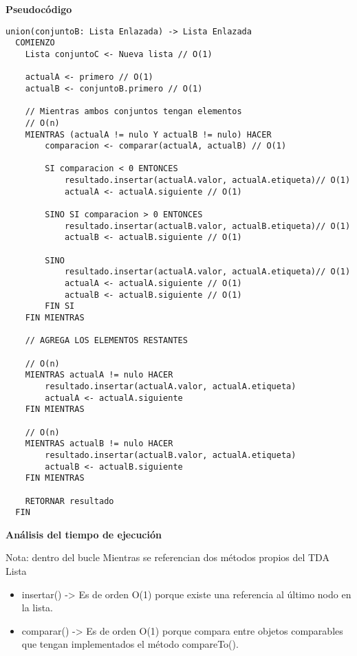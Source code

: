 \documentclass[12pt,letterpaper, onecolumn]{exam}
\begin{document}
\begin{questions}
\begin{solution}
    \end{solution}

    \begin{solution}
  \textbf{Pseudocódigo} 


\begin{verbatim}
union(conjuntoB: Lista Enlazada) -> Lista Enlazada
  COMIENZO
    Lista conjuntoC <- Nueva lista // O(1)
    
    actualA <- primero // O(1)
    actualB <- conjuntoB.primero // O(1)
    
    // Mientras ambos conjuntos tengan elementos
    // O(n)
    MIENTRAS (actualA != nulo Y actualB != nulo) HACER
        comparacion <- comparar(actualA, actualB) // O(1)
        
        SI comparacion < 0 ENTONCES
            resultado.insertar(actualA.valor, actualA.etiqueta)// O(1)
            actualA <- actualA.siguiente // O(1)
            
        SINO SI comparacion > 0 ENTONCES
            resultado.insertar(actualB.valor, actualB.etiqueta)// O(1)
            actualB <- actualB.siguiente // O(1)
            
        SINO
            resultado.insertar(actualA.valor, actualA.etiqueta)// O(1)
            actualA <- actualA.siguiente // O(1)
            actualB <- actualB.siguiente // O(1)
        FIN SI
    FIN MIENTRAS
    
    // AGREGA LOS ELEMENTOS RESTANTES

    // O(n)
    MIENTRAS actualA != nulo HACER
        resultado.insertar(actualA.valor, actualA.etiqueta)
        actualA <- actualA.siguiente
    FIN MIENTRAS
    
    // O(n)
    MIENTRAS actualB != nulo HACER
        resultado.insertar(actualB.valor, actualA.etiqueta)
        actualB <- actualB.siguiente
    FIN MIENTRAS
    
    RETORNAR resultado
  FIN 
  \end{verbatim}
    \textbf{Análisis del tiempo de ejecución} 

    Nota: dentro del bucle Mientras se referencian dos métodos propios del TDA Lista
    \begin{itemize}
      \item insertar() -> Es de orden O(1) porque existe una referencia al último nodo en la lista.
      \item comparar() -> Es de orden O(1) porque compara entre objetos comparables que tengan implementados el método compareTo().
    \end{itemize}


\end{solution}
\end{questions}
\end{document}
